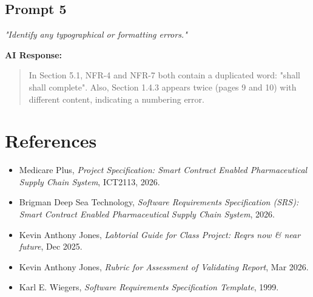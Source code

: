 \documentclass[11pt,a4paper]{article}
\begin{document}
\subsection*{Prompt 5}
\textit{"Identify any typographical or formatting errors."}

\textbf{AI Response:}
\begin{quote}
In Section 5.1, NFR-4 and NFR-7 both contain a duplicated word: "shall shall complete". Also, Section 1.4.3 appears twice (pages 9 and 10) with different content, indicating a numbering error.
\end{quote}

\clearpage
{}
\setcounter{page}{1}
\renewcommand{\thepage}{R-\arabic{page}}
\section*{References}
\begin{itemize}[leftmargin=*,nosep]
\item Medicare Plus, \textit{Project Specification: Smart Contract Enabled Pharmaceutical Supply Chain System}, ICT2113, 2026.
\item Brigman Deep Sea Technology, \textit{Software Requirements Specification (SRS): Smart Contract Enabled Pharmaceutical Supply Chain System}, 2026.
\item Kevin Anthony Jones, \textit{Labtorial Guide for Class Project: Reqrs now \& near future}, Dec 2025.
\item Kevin Anthony Jones, \textit{Rubric for Assessment of Validating Report}, Mar 2026.
\item Karl E. Wiegers, \textit{Software Requirements Specification Template}, 1999.
\end{itemize}
\end{document}
